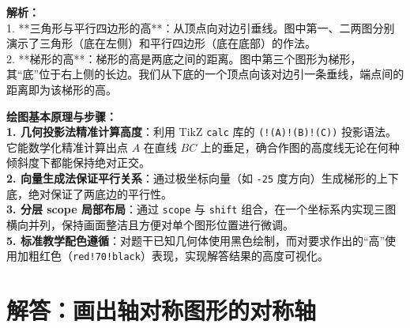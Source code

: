 \begin{center}
\end{center}

\vspace{0.8cm}

{\small\color{gray}
\textbf{解析：}\\
1. **三角形与平行四边形的高**：从顶点向对边引垂线。图中第一、二两图分别演示了三角形（底在左侧）和平行四边形（底在底部）的作法。\\
2. **梯形的高**：梯形的高是两底之间的距离。图中第三个图形为梯形，其“底”位于右上侧的长边。我们从下底的一个顶点向该对边引一条垂线，端点间的距离即为该梯形的高。
}

\vspace{0.6cm}

{\small\color{blue!70!black}
\textbf{绘图基本原理与步骤：}\\
\textbf{1. 几何投影法精准计算高度}：利用 TikZ \texttt{calc} 库的 \texttt{(!(A)!(B)!(C))} 投影语法。它能数学化精准计算出点 $A$ 在直线 $BC$ 上的垂足，确合作图的高度线无论在何种倾斜度下都能保持绝对正交。\\
\textbf{2. 向量生成法保证平行关系}：通过极坐标向量（如 \texttt{-25} 度方向）生成梯形的上下底，绝对保证了两底边的平行性。\\
\textbf{3. 分层 scope 局部布局}：通过 \texttt{scope} 与 \texttt{shift} 组合，在一个坐标系内实现三图横向并列，保持画面整洁且方便对单个图形位置进行微调。\\
\textbf{5. 标准教学配色遵循}：对题干已知几何体使用黑色绘制，而对要求作出的“高”使用加粗红色（\texttt{red!70!black}）表现，实现解答结果的高度可视化。
}

\newpage


\section{解答：画出轴对称图形的对称轴}

